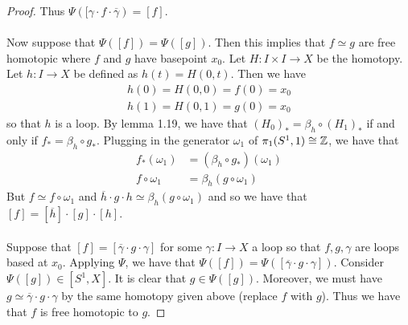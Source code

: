 \documentclass[a4paper]{article}
\begin{document}
\begin{ex}{}{}
\begin{proof}
Thus $\Psi([\gamma\cdot f\cdot\overline{\gamma})=[f]$. \\~\\

Now suppose that $\Psi([f])=\Psi([g])$. Then this implies that $f\simeq g$ are free homotopic where $f$ and $g$ have basepoint $x_0$. Let $H:I\times I\to X$ be the homotopy. Let $h:I\to X$ be defined as $h(t)=H(0,t)$. Then we have 
\begin{gather*}
h(0)=H(0,0)=f(0)=x_0\\
h(1)=H(0,1)=g(0)=x_0
\end{gather*}
so that $h$ is a loop. By lemma 1.19, we have that $(H_0)_\ast=\beta_h\circ(H_1)_\ast$ if and only if $f_\ast=\beta_h\circ g_\ast$. Plugging in the generator $\omega_1$ of $\pi_1(S^1,1)\cong\mathbb{Z}$, we have that 
\begin{align*}
f_\ast(\omega_1)&=(\beta_h\circ g_\ast)(\omega_1)\\
f\circ\omega_1&=\beta_h(g\circ\omega_1)
\end{align*}
But $f\simeq f\circ\omega_1$ and $\overline{h}\cdot g\cdot h\simeq\beta_h(g\circ\omega_1)$ and so we have that $[f]=[\overline{h}]\cdot[g]\cdot[h]$. \\~\\

Suppose that $[f]=[\overline{\gamma}\cdot g\cdot\gamma]$ for some $\gamma:I\to X$ a loop so that $f,g,\gamma$ are loops based at $x_0$. Applying $\Psi$, we have that $\Psi([f])=\Psi([\overline{\gamma}\cdot g\cdot\gamma])$. Consider $\Psi([g])\in[S^1,X]$. It is clear that $g\in\Psi([g])$. Moreover, we must have $g\simeq\overline{\gamma}\cdot g\cdot\gamma$ by the same homotopy given above (replace $f$ with $g$). Thus we have that $f$ is free homotopic to $g$. 
\end{proof}
\end{ex}
\end{document}
